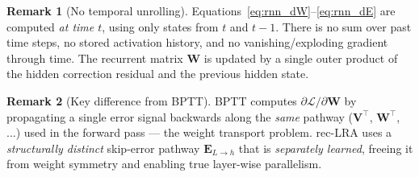 \documentclass[11pt]{article}
\theoremstyle{definition}
\newtheorem{remark}{Remark}[section]
\begin{document}
\begin{remark}[No temporal unrolling]
Equations~\eqref{eq:rnn_dW}--\eqref{eq:rnn_dE} are computed \emph{at time $t$},
using only states from $t$ and $t{-}1$. There is no sum over past time steps,
no stored activation history, and no vanishing/exploding gradient through time.
The recurrent matrix $\mathbf{W}$ is updated by a single outer product of the
hidden correction residual and the previous hidden state.
\end{remark}

\begin{remark}[Key difference from BPTT]
BPTT computes $\partial \mathcal{L}/\partial \mathbf{W}$ by propagating a single
error signal backwards along the \emph{same} pathway ($\mathbf{V}^\top$,
$\mathbf{W}^\top$, ...) used in the forward pass — the weight transport problem.
rec-LRA uses a \emph{structurally distinct} skip-error pathway $\mathbf{E}_{L \to h}$
that is \emph{separately learned}, freeing it from weight symmetry and enabling
true layer-wise parallelism.
\end{remark}
\end{document}

